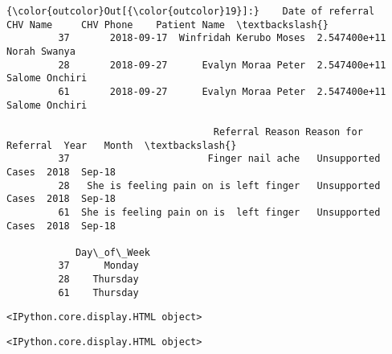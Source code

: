 \documentclass[11pt]{article}
\begin{document}
    
\begin{Verbatim}[commandchars=\\\{\}]
{\color{outcolor}Out[{\color{outcolor}19}]:}    Date of referral                CHV Name     CHV Phone    Patient Name  \textbackslash{}
         37       2018-09-17  Winfridah Kerubo Moses  2.547400e+11    Norah Swanya   
         28       2018-09-27      Evalyn Moraa Peter  2.547400e+11  Salome Onchiri   
         61       2018-09-27      Evalyn Moraa Peter  2.547400e+11  Salome Onchiri   
         
                                    Referral Reason Reason for Referral  Year   Month  \textbackslash{}
         37                        Finger nail ache   Unsupported Cases  2018  Sep-18   
         28   She is feeling pain on is left finger   Unsupported Cases  2018  Sep-18   
         61  She is feeling pain on is  left finger   Unsupported Cases  2018  Sep-18   
         
            Day\_of\_Week  
         37      Monday  
         28    Thursday  
         61    Thursday  
\end{Verbatim}
            
    
    \begin{verbatim}
<IPython.core.display.HTML object>
    \end{verbatim}

    
    
    \begin{verbatim}
<IPython.core.display.HTML object>
    \end{verbatim}
\end{document}
